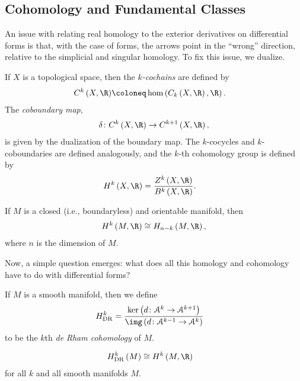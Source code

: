 \documentclass[10pt]{mypackage}
\begin{document}
\subsection{Cohomology and Fundamental Classes}%
An issue with relating real homology to the exterior derivatives on differential forms is that, with the case of forms, the arrows point in the ``wrong'' direction, relative to the simplicial and singular homology. To fix this issue, we dualize.
\begin{definition}
  If $X$ is a topological space, then the \textit{$k$-cochains} are defined by
  \begin{align*}
    C^k\left( X,\R \right) &\coloneq \hom\left( C_k\left( X,\R \right),\R \right).
  \end{align*}
  The \textit{coboundary map},
  \begin{align*}
    \delta\colon C^k\left( X,\R \right) \rightarrow C^{k+1}\left( X,\R \right),
  \end{align*}
  is given by the dualization of the boundary map. The $k$-cocycles and $k$-coboundaries are defined analogously, and the $k$-th cohomology group is defined by
  \begin{align*}
    H^k\left( X,\R \right) &= \frac{Z^k\left( X,\R \right)}{B^k\left( X,\R \right)}.
  \end{align*}
\end{definition}
\begin{theorem}
  If $M$ is a closed (i.e., boundaryless) and orientable manifold, then
  \begin{align*}
    H^{k}\left( M,\R \right)\cong H_{n-k}\left( M,\R \right),
  \end{align*}
  where $n$ is the dimension of $M$.
\end{theorem}
Now, a simple question emerges: what does all this homology and cohomology have to do with differential forms?
\begin{definition}
  If $M$ is a smooth manifold, then we define
  \begin{align*}
    H^{k}_{\operatorname{DR}} &= \frac{\ker\left( d\colon \mathcal{A}^{k}\rightarrow \mathcal{A}^{k+1} \right)}{\img\left( d\colon \mathcal{A}^{k-1}\rightarrow \mathcal{A}^{k} \right)}
  \end{align*}
  to be the $k$th \textit{de Rham cohomology} of $M$.
\end{definition}
\begin{theorem}
  \begin{align*}
    H^{k}_{\operatorname{DR}}\left( M \right) &\cong H^{k}\left( M,\R \right)
  \end{align*}
  for all $k$ and all smooth manifolds $M$.
\end{theorem}
\end{document}
